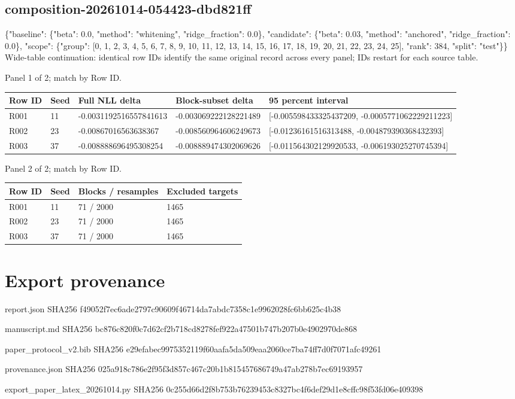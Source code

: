 \documentclass[10pt]{article}
\begin{document}
\subsection{composition-20261014-054423-dbd821ff}
\{"baseline": \{"beta": 0.0, "method": "whitening", "ridge\_fraction": 0.0\}, "candidate": \{"beta": 0.03, "method": "anchored", "ridge\_fraction": 0.0\}, "scope": \{"group": [0, 1, 2, 3, 4, 5, 6, 7, 8, 9, 10, 11, 12, 13, 14, 15, 16, 17, 18, 19, 20, 21, 22, 23, 24, 25], "rank": 384, "split": "test"\}\}
Wide-table continuation: identical row IDs identify the same original record across every panel; IDs restart for each source table.
\par\noindent Panel 1 of 2; match by Row ID.
{\scriptsize\setlength{\tabcolsep}{2pt}
\begin{longtable}{p{}p{}p{}p{}p{}}
Row ID & Seed & Full NLL delta & Block-subset delta & 95 percent interval \\
\hline\endhead
R001 & 11 & -0.0031192516557841613 & -0.003069222128221489 & [-0.005598433325437209, -0.0005771062229211223] \\
R002 & 23 & -0.00867016563638367 & -0.008560964606249673 & [-0.01236161516313488, -0.004879390368432393] \\
R003 & 37 & -0.008888696495308254 & -0.008889474302069626 & [-0.011564302129920533, -0.006193025270745394] \\
\end{longtable}}
\par\noindent Panel 2 of 2; match by Row ID.
{\scriptsize\setlength{\tabcolsep}{2pt}
\begin{longtable}{p{}p{}p{}p{}}
Row ID & Seed & Blocks / resamples & Excluded targets \\
\hline\endhead
R001 & 11 & 71 / 2000 & 1465 \\
R002 & 23 & 71 / 2000 & 1465 \\
R003 & 37 & 71 / 2000 & 1465 \\
\end{longtable}}
\section{Export provenance}
\par\noindent\small report.json SHA256 f49052f7ec6ade2797c90609f46714da7abdc7358c1e9962028fc6bb625c4b38
\par\noindent\small manuscript.md SHA256 bc876c820f0c7d62cf2b718cd8278fef922a47501b747b207b0e4902970de868
\par\noindent\small paper\_protocol\_v2.bib SHA256 e29efabec9975352119f60aafa5da509eaa2060ce7ba74ff7d0f7071afc49261
\par\noindent\small provenance.json SHA256 025a918c786e2f95f3d857c467c20b1b815457686749a47ab278b7ec69193957
\par\noindent\small export\_paper\_latex\_20261014.py SHA256 0c255d66d2f8b753b76239453c8327bc4f6def29d1e8cffc98f53fd06e409398
\end{document}
